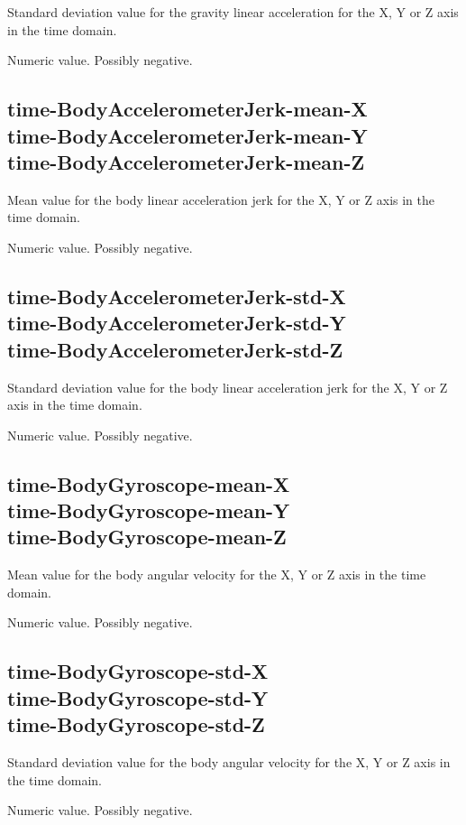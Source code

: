 \documentclass[a4paper,10pt]{report}
\begin{document}
Standard deviation value for the gravity linear acceleration for the X, Y or Z axis in the time domain.

Numeric value. Possibly negative.

\subsection*{time-BodyAccelerometerJerk-mean-X\\time-BodyAccelerometerJerk-mean-Y\\time-BodyAccelerometerJerk-mean-Z} 

Mean value for the body linear acceleration jerk for the X, Y or Z axis in the time domain.

Numeric value. Possibly negative.

\subsection*{time-BodyAccelerometerJerk-std-X\\time-BodyAccelerometerJerk-std-Y\\time-BodyAccelerometerJerk-std-Z} 

Standard deviation value for the body linear acceleration jerk for the X, Y or Z axis in the time domain.

Numeric value. Possibly negative.

\subsection*{time-BodyGyroscope-mean-X\\time-BodyGyroscope-mean-Y\\time-BodyGyroscope-mean-Z} 

Mean value for the body angular velocity for the X, Y or Z axis in the time domain.

Numeric value. Possibly negative.

\subsection*{time-BodyGyroscope-std-X\\time-BodyGyroscope-std-Y\\time-BodyGyroscope-std-Z} 

Standard deviation value for the body angular velocity for the X, Y or Z axis in the time domain.

Numeric value. Possibly negative.
\end{document}
